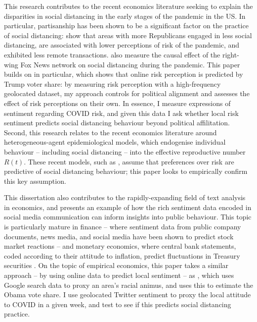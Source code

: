 \documentclass{article}
\begin{document}
This research contributes to the recent economics literature seeking to explain the disparities in social distancing in the early stages of the pandemic in the US. In particular, partisanship has been shown to be a significant factor on the practice of social distancing: \textcite{allcottPolarizationPublicHealth2020,barriosRiskPerceptionLens2020,painterPoliticalBeliefsAffect2020} show that areas with more Republicans engaged in less social distancing, are associated with lower perceptions of risk of the pandemic, and exhibited less remote transactions. \textcite{simonovPersuasiveEffectFox2020,ananyevSafestTimeFly2020} also measure the causal effect of the right-wing Fox News network on social distancing during the pandemic. This paper builds on \textcite{barriosRiskPerceptionLens2020} in particular, which shows that online risk perception is predicted by Trump voter share: by measuring risk perception with a high-frequency geolocated dataset, my approach controls for political alignment and assesses the effect of risk perceptions on their own. In essence, I measure expressions of sentiment regarding COVID risk, and given this data I ask whether local risk sentiment predicts social distancing behaviour beyond political affilitation. Second, this research relates to the recent economics literature around heterogeneous-agent epidemiological models, which endogenise individual behaviour -- including social distancing -- into the effective reproductive number \(R(t)\). These recent models, such as \textcite{acemogluTestingVoluntarySocial2020,brotherhoodEconomicModelCOVID192020,eichenbaumMacroeconomicsEpidemics2020}, assume that preferences over risk are predictive of social distancing behaviour; this paper looks to empirically confirm this key assumption.


This dissertation also contributes to the rapidly-expanding field of text analysis in economics, and presents an example of how the rich sentiment data encoded in social media communication can inform insights into public behaviour. This topic is particularly mature in finance -- where sentiment data from public company documents, news media, and social media have been shown to predict stock market reactions \parencite{bollenTwitterMoodPredicts2011} -- and monetary economics, where central bank statements, coded according to their attitude to inflation, predict fluctuations in Treasury securities \parencite{luccaMeasuringCentralBank2009,gentzkowTextData2019}. On the topic of empirical economics, this paper takes a similar approach -- by using online data to predict local sentiment -- as \textcite{stephens-davidowitzCostRacialAnimus2014}, which uses Google search data to proxy an area's racial animus, and uses this to estimate the Obama vote share. I use geolocated Twitter sentiment to proxy the local attitude to COVID in a given week, and test to see if this predicts social distancing practice. 
\end{document}
